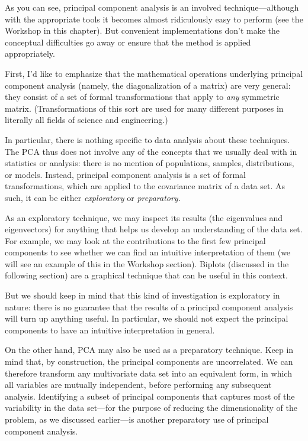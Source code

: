  
As you can see, principal component analysis is an involved
technique---although with the appropriate tools it becomes almost
ridiculously easy to perform (see the Workshop in this chapter). But
convenient implementations don't make the conceptual difficulties go
away or ensure that the method is applied appropriately.

First, I'd like to emphasize that the mathematical operations
underlying principal component analysis (namely, the diagonalization
of a matrix) are very general: they consist of a set of formal
transformations that apply to \emph{any} symmetric matrix.
(Transformations of this sort are used for many different purposes
in literally all fields of science and engineering.)

In particular, there is nothing specific to data analysis about these
techniques. The PCA thus does not involve any of the concepts that we
usually deal with in statistics or analysis: there is no mention of
populations, samples, distributions, or models. Instead, principal
component analysis is a set of formal transformations, which are
applied to the covariance matrix of a data set. As such, it can be
either \emph{exploratory} or \emph{preparatory}.

As an exploratory technique, we may inspect its results (the
eigenvalues and eigenvectors) for anything that helps us develop an
understanding of the data set. For example, we may look at the
contributions to the first few principal components to see whether we
can find an intuitive interpretation of them (we will see an example
of this in the Workshop section).  Biplots (discussed in the following
section) are a graphical technique that can be useful in this context.

But we should keep in mind that this kind of investigation is
exploratory in nature: there is no guarantee that the results of a
principal component analysis will turn up anything useful. In
particular, we should not expect the principal components to have an
intuitive interpretation in general.

On the other hand, PCA may also be used as a preparatory technique.
Keep in mind that, by construction, the principal components are
uncorrelated. We can therefore transform any multivariate data set into
an equivalent form, in which all variables are mutually independent,
before performing any subsequent analysis.  Identifying a subset of
principal components that captures most of the variability in the data
set---for the purpose of reducing the dimensionality of the problem,
as we discussed earlier---is another preparatory use of principal
component analysis.

